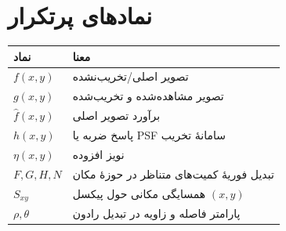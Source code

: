 \documentclass[12pt,a4paper]{report}
\begin{document}
\section*{نمادهای پرتکرار}
\begin{longtable}{>{\raggedleft\arraybackslash}p{} p{}}
\toprule
نماد & معنا \\
\midrule
\(f(x,y)\) & تصویر اصلی/تخریب‌نشده \\
\(g(x,y)\) & تصویر مشاهده‌شده و تخریب‌شده \\
\(\hat f(x,y)\) & برآورد تصویر اصلی \\
\(h(x,y)\) & پاسخ ضربه یا PSF سامانهٔ تخریب \\
\(\eta(x,y)\) & نویز افزوده \\
\(F,G,H,N\) & تبدیل فوریهٔ کمیت‌های متناظر در حوزهٔ مکان \\
\(S_{xy}\) & همسایگی مکانی حول پیکسل \((x,y)\) \\
\(\rho,\theta\) & پارامتر فاصله و زاویه در تبدیل رادون \\
\bottomrule
\end{longtable}
\clearpage
\end{document}
